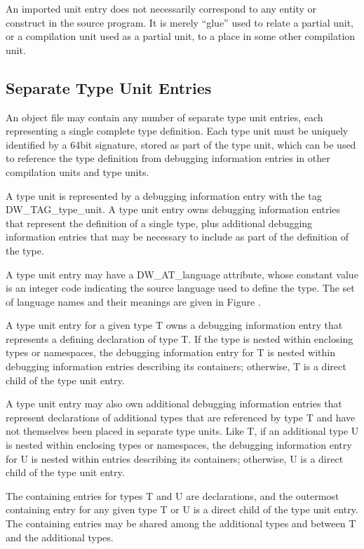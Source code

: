An imported unit entry does not necessarily correspond to
any entity or construct in the source program. It is merely
“glue” used to relate a partial unit, or a compilation
unit used as a partial unit, to a place in some other
compilation unit.

\subsection{Separate Type Unit Entries}
\label{chap:separatetypeunitentries}
An object file may contain any number of separate type
unit entries, each representing a single complete type
definition. Each type unit must be uniquely identified by
a 64\dash bit signature, stored as part of the type unit, which
can be used to reference the type definition from debugging
information entries in other compilation units and type units.

A type unit is represented by a debugging information entry
with the tag DW\-\_TAG\-\_type\-\_unit. 
A type unit entry owns debugging
information entries that represent the definition of a single
type, plus additional debugging information entries that may
be necessary to include as part of the definition of the type.

A type unit entry may have a DW\_AT\_language attribute, whose
constant value is an integer code indicating the source
language used to define the type. The set of language names
and their meanings are given in Figure .

A type unit entry for a given type T owns a debugging
information entry that represents a defining declaration
of type T. If the type is nested within enclosing types or
namespaces, the debugging information entry for T is nested
within debugging information entries describing its containers;
otherwise, T is a direct child of the type unit entry.

A type unit entry may also own additional debugging information
entries that represent declarations of additional types that
are referenced by type T and have not themselves been placed in
separate type units. Like T, if an additional type U is nested
within enclosing types or namespaces, the debugging information
entry for U is nested within entries describing its containers;
otherwise, U is a direct child of the type unit entry.

The containing entries for types T and U are declarations,
and the outermost containing entry for any given type T or
U is a direct child of the type unit entry. The containing
entries may be shared among the additional types and between
T and the additional types.

